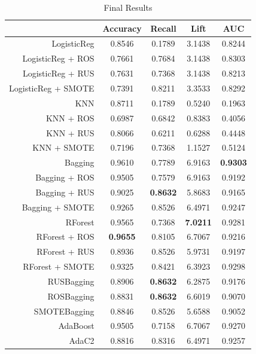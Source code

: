 \documentclass[12pt,letterpaper]{article}
\begin{document}
\begin{table}[!htb]
	\centering
	\addtolength{\tabcolsep}{6pt}
	\begin{tabular}{|r|cccc|}
		\hline
		& Accuracy & Recall & Lift & AUC \\ 
		\hline
		LogisticReg  & 0.8546 & 0.1789 & 3.1438 & 0.8244 \\ 
		LogisticReg + ROS & 0.7661 & 0.7684 & 3.1438 & 0.8303 \\ 
		LogisticReg + RUS & 0.7631 & 0.7368 & 3.1438 & 0.8213 \\ 
		LogisticReg + SMOTE & 0.7391 & 0.8211 & 3.3533 & 0.8292 \\ 
		KNN  & 0.8711 & 0.1789 & 0.5240 & 0.1963 \\ 
		KNN + ROS & 0.6987 & 0.6842 & 0.8383 & 0.4056 \\ 
		KNN + RUS & 0.8066 & 0.6211 & 0.6288 & 0.4448 \\ 
		KNN + SMOTE & 0.7196 & 0.7368 & 1.1527 & 0.5124 \\ 
		Bagging  & 0.9610 & 0.7789 & 6.9163 & \textbf{0.9303} \\ 
		Bagging + ROS & 0.9505 & 0.7579 & 6.9163 & 0.9192 \\ 
		Bagging + RUS & 0.9025 & \textbf{0.8632} & 5.8683 & 0.9165 \\ 
		Bagging + SMOTE & 0.9265 & 0.8526 & 6.4971 & 0.9247 \\ 
		RForest  & 0.9565 & 0.7368 &\textbf{ 7.0211} & 0.9281 \\ 
		RForest + ROS & \textbf{0.9655} & 0.8105 & 6.7067 & 0.9216 \\ 
		RForest + RUS & 0.8936 & 0.8526 & 5.9731 & 0.9197 \\ 
		RForest + SMOTE & 0.9325 & 0.8421 & 6.3923 & 0.9298 \\ 
		RUSBagging & 0.8906 & \textbf{0.8632} & 6.2875 & 0.9176 \\ 
		ROSBagging & 0.8831 & \textbf{0.8632} & 6.6019 & 0.9070 \\ 
		SMOTEBagging & 0.8846 & 0.8526 & 5.6588 & 0.9052 \\ 
		AdaBoost & 0.9505 & 0.7158 & 6.7067 & 0.9270 \\ 
		AdaC2 & 0.8816 & 0.8316 & 6.4971 & 0.9257 \\ 
		\hline
	\end{tabular}
\caption{Final Results}
\label{whole}
\end{table}


	\newpage
	\printbibliography
\end{document}

